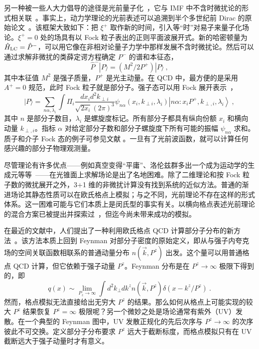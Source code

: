 另一种被一些人大力倡导的途径是光前量子化~\cite{Ji:1992ku,Burkardt:1995ct,Brodsky:1997de}，它与 IMF 中不含时微扰论的形式相关联~\cite{Weinberg:1966jm}。事实上，动力学理论的光前表述可以追溯到半个多世纪前 Dirac 的原始论文~\cite{Dirac:1949cp}。该框架大致如下：把 $\xi^+$ 取作新的时间，引入等``时''对易子来量子化场论。$\xi^+=0$ 处的场具有以 Fock 粒子表出的正则平面波展开式。新的哈密顿量为 $\hat H_{\rm LC}= \hat P^-$，可以用它像在非相对论量子力学中那样发展不含时微扰论。然后可以通过求解非微扰的类薛定谔方程确定 $P^-$ 的谱和本征态，
\begin{equation}
      \hat P^-|P\rangle = (M^2/2P^+)|P\rangle \ ,
\end{equation}
其中本征值 $M^2$ 是强子质量，$P^+$ 是光主动量。在 QCD 中，最方便的是采用 $A^+=0$ 规范，此时 Fock 粒子就是部分子。强子态可以用 Fock 展开表示~\cite{Brodsky:1997de}，
\begin{equation}
             |P\rangle = \sum_{n\alpha, \lambda_i} \int \Pi_i \frac{dx_id^2k_{\perp i}}{\sqrt{2x_i}(2\pi)^3} \psi_{n\alpha}(x_i, k_{\perp i}, \lambda_i) \left|n\alpha
             : x_iP^+, k_{\perp,i},\lambda_i \right\rangle \ ,
\end{equation}
其中 $n$ 是部分子数目，$\lambda_i$ 是螺旋度标记。所有部分子都具有纵向份额 $x_i$ 和横向动量 $k_{\perp, i}$。指标 $\alpha$ 对给定部分子数和部分子螺旋度下所有可能的振幅 $\psi_{n\alpha}$ 求和。质子和介子 Fock 态的例子可参见文献 \cite{Ji:2002xn,Ji:2003yj}。一旦有了光前波函数，就可以计算任何感兴趣的部分子物理观测量。

尽管理论有许多优点——例如真空变得``平庸''、洛伦兹群多出一个成为运动学的生成元等等~\cite{Brodsky:1997de}——在光锥面上求解场论是出了名地困难。除了二维理论和按 Fock 粒子数的微扰展开之外，3+1 维的非微扰计算没有找到系统的近似方法。普通的渐进场论其静态性质可以在欧氏格点上模拟；与之不同，光前理论不存在这样的形式体系。这一困难可能与它们本质上是闵氏型的事实有关。以横向格点表述光前理论的混合方案已被提出并探索过~\cite{Bardeen:1979xx}，但迄今尚未带来成功的模拟。

在最近的文献中，人们提出了一种利用欧氏格点 QCD 计算部分子分布的新方法~\cite{Ji:2013fga, Ji:2013dva, Xiong:2013bka,Hatta:2013gta,Lin:2014zya}。该方法本质上回到 Feynman 对部分子密度的原始定义，即从与强子内夸克场的空间关联函数相联系的普通动量分布 $n(\vec{k}, P^z)$ 出发。这个量可以用普通格点 QCD 计算，但它依赖于强子动量 $P^z$。Feynman 分布是在 $P^z\rightarrow \infty$ 极限下得到的，即
\begin{equation}
                q(x) \sim \lim_{P_z\rightarrow\infty} \int d^2k_\perp dk^z n(\vec{k},P^z)\delta (x-k^z/P^z) \ .
\end{equation}
然而，格点模拟无法直接给出无穷大 $P^z$ 的结果。那么如何从格点上可能实现的较大 $P^z$ 结果恢复 $P^z=\infty$ 极限呢？另一个微妙之处是场论通常有紫外（UV）发散。在一个典型的 Feynman 图中，UV 发散正规化的先后次序与 $P^z\rightarrow \infty$ 的次序彼此不可交换。定义部分子分布要求 $P^z$ 远大于截断标度，而格点模拟只有在 UV 截断远大于强子动量时才有意义。

